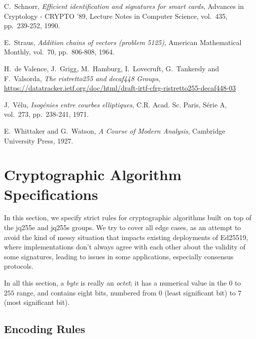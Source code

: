 \documentclass{llncs}
\begin{document}
\begin{thebibliography}{20}
C.~Schnorr,
\emph{Efficient identification and signatures for smart cards},
Advances in Cryptology - CRYPTO '89, Lecture Notes in Computer Science,
vol.~435, pp.~239-252, 1990.

E.~Straus,
\emph{Addition chains of vectors (problem 5125)},
American Mathematical Monthly, vol.~70, pp.~806-808, 1964.

H.~de Valence, J.~Grigg, M.~Hamburg, I.~Lovecruft, G.~Tankersly and
F.~Valsorda,
\emph{The ristretto255 and decaf448 Groups},\\
\url{https://datatracker.ietf.org/doc/html/draft-irtf-cfrg-ristretto255-decaf448-03}

J.~Vélu,
\emph{Isogénies entre courbes elliptiques},
C.R. Acad. Sc. Paris, Série A, vol.~273, pp.~238-241, 1971.

E.~Whittaker and G.~Watson,
\emph{A Course of Modern Analysis},
Cambridge University Press, 1927.

\end{thebibliography}


\appendix

\section{Cryptographic Algorithm Specifications}\label{sec:algspec}

In this section, we specify strict rules for cryptographic algorithms
built on top of the jq255e and jq255s groups. We try to cover all edge
cases, as an attempt to avoid the kind of messy situation that impacts
existing deployments of Ed25519, where implementations don't always agree
with each other about the validity of some signatures, leading to issues
in some applications, especially consensus protocols\cite{ChaGarNik2020}.

In all this section, a \emph{byte} is really an \emph{octet}; it has a
numerical value in the $0$ to $255$ range, and contains eight bits,
numbered from $0$ (least significant bit) to $7$ (most significant bit).

\subsection{Encoding Rules}\label{sec:spec-encoding}
\end{document}
